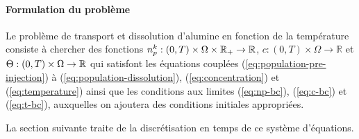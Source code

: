\paragraph{Formulation du problème}
Le problème de transport et dissolution d'alumine en fonction de la
température consiste à chercher des fonctions $n_p^k:(0,
T)\times\Omega\times\mathbb R_+\to \mathbb R$, $c:(0, T)\times\Omega\to
\mathbb R$ et $\Theta:(0, T)\times\Omega\to\mathbb R$ qui
satisfont les équations couplées (\ref{eq:population-pre-injection}) à
(\ref{eq:population-dissolution}), (\ref{eq:concentration}) et
(\ref{eq:temperature}) ainsi que les conditions aux limites
(\ref{eq:np-bc}), (\ref{eq:c-bc}) et (\ref{eq:t-bc}), auxquelles on
ajoutera des conditions initiales appropriées.

La section suivante traite de la discrétisation en temps de ce
système d'équations.
